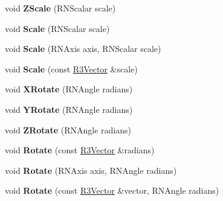 \begin{DoxyCompactItemize}
\item 
void {\bfseries Z\+Scale} (R\+N\+Scalar scale)\hypertarget{class_r3_affine_a576bc98c90a28aafc7abd0640b13ba42}{}\label{class_r3_affine_a576bc98c90a28aafc7abd0640b13ba42}

\item 
void {\bfseries Scale} (R\+N\+Scalar scale)\hypertarget{class_r3_affine_ad141fea29c141a8122390a38a50cf4ad}{}\label{class_r3_affine_ad141fea29c141a8122390a38a50cf4ad}

\item 
void {\bfseries Scale} (R\+N\+Axis axis, R\+N\+Scalar scale)\hypertarget{class_r3_affine_a0dbf0268adc9a2d84df1eed9f3f4dfa9}{}\label{class_r3_affine_a0dbf0268adc9a2d84df1eed9f3f4dfa9}

\item 
void {\bfseries Scale} (const \hyperlink{class_r3_vector}{R3\+Vector} \&scale)\hypertarget{class_r3_affine_a6890f28c86625a3913e141bcdfa51c02}{}\label{class_r3_affine_a6890f28c86625a3913e141bcdfa51c02}

\item 
void {\bfseries X\+Rotate} (R\+N\+Angle radians)\hypertarget{class_r3_affine_a5d09945febfc22742429b6f931ff5701}{}\label{class_r3_affine_a5d09945febfc22742429b6f931ff5701}

\item 
void {\bfseries Y\+Rotate} (R\+N\+Angle radians)\hypertarget{class_r3_affine_afa7efa31ccfe53b11f4c2a59a8c493ea}{}\label{class_r3_affine_afa7efa31ccfe53b11f4c2a59a8c493ea}

\item 
void {\bfseries Z\+Rotate} (R\+N\+Angle radians)\hypertarget{class_r3_affine_a30227412eb45a79f1ad62bfdde696a60}{}\label{class_r3_affine_a30227412eb45a79f1ad62bfdde696a60}

\item 
void {\bfseries Rotate} (const \hyperlink{class_r3_vector}{R3\+Vector} \&radians)\hypertarget{class_r3_affine_a416257ce5f316a73e66cb807a49403bb}{}\label{class_r3_affine_a416257ce5f316a73e66cb807a49403bb}

\item 
void {\bfseries Rotate} (R\+N\+Axis axis, R\+N\+Angle radians)\hypertarget{class_r3_affine_a38df894e7c4a150674de657c756931f3}{}\label{class_r3_affine_a38df894e7c4a150674de657c756931f3}

\item 
void {\bfseries Rotate} (const \hyperlink{class_r3_vector}{R3\+Vector} \&vector, R\+N\+Angle radians)\hypertarget{class_r3_affine_aaa59fbf247fcddbfda6d62b94cd7fe90}{}\label{class_r3_affine_aaa59fbf247fcddbfda6d62b94cd7fe90}


\end{DoxyCompactItemize}
